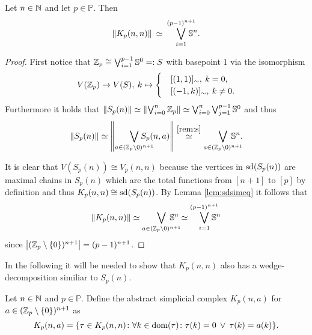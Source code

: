 \begin{lemma}
  Let $n \in \mathbb{N}$ and let $p \in \mathbb{P}$. Then
  \begin{equation*}
    \lVert K_p(n,n) \rVert \: \simeq \: \bigvee_{i=1}^{(p-1)^{n+1}}\hspace*{-10px}\mathbb{S}^{n}.
  \end{equation*}
\end{lemma}

\begin{proof}
  First notice that $\mathbb{Z}_p \cong \bigvee_{i=1}^{p-1}\mathbb{S}^0 =: S$ with basepoint $1$ via the isomorphism
  \begin{equation*}
    V(\mathbb{Z}_p) \to V(S), \: k \mapsto \begin{cases}
      &[(1, 1)]_\sim, \: k = 0, \\
      &[(-1,k)]_\sim, \: k \neq 0.
    \end{cases}
  \end{equation*}
  Furthermore it holds that $\lVert S_p(n) \rVert \simeq \left\lVert \bigvee_{i=0}^n\mathbb{Z}_p \right\rVert \simeq \bigvee_{i=0}^n\bigvee_{j=1}^{p-1}\mathbb{S}^0$ and thus
  \begin{equation*}
    \lVert S_p(n) \rVert \simeq \left\lVert \bigvee_{a\in(\Z_p \setminus {0})^{n+1}} \hspace*{-17px}S_p(n,a) \right\rVert \overset{\ref{rem:s}}{\simeq} \bigvee_{a\in(\Z_p \setminus {0})^{n+1}}\hspace*{-15px}\mathbb{S}^n.
  \end{equation*}

  It is clear that $V(S_p(n)) \cong V_p(n,n)$ because the vertices in ${\rm sd}(S_p(n))$ are maximal chains in $S_p(n)$ which are the total functions from $[n+1]$ to $[p]$ by definition and thus $K_p(n,n) \cong {\rm sd}(S_p(n))$. By Lemma \ref{lem:sdsimeq} it follows that
  \begin{equation*}
    \lVert K_p(n, n) \rVert \simeq \bigvee_{a\in(\Z_p \setminus {0})^{n+1}}\hspace*{-15px}\mathbb{S}^n \simeq \bigvee_{i=1}^{(p-1)^{n+1}}\hspace*{-10px}\mathbb{S}^n
  \end{equation*}
  since $\left|(\mathbb{Z}_p\setminus\{0\})^{n+1}\right| = (p-1)^{n+1}$.
\end{proof}

In the following it will be needed to show that $K_p(n,n)$ also has a wedge-decomposition similiar to $S_p(n)$.
\begin{defin}
  Let $n\in\mathbb{N}$ and $p\in \mathbb{P}$. Define the abstract simplicial complex $K_p(n,a)$ for $a \in (\mathbb{Z}_p\setminus\{0\})^{n+1}$ as
  \begin{equation*}
    K_p(n,a) = \{\tau \in K_p(n,n)\colon \forall k\in{\rm dom}(\tau)\colon \tau(k) = 0 \: \lor \: \tau(k) = a(k)\}. \qedhere
  \end{equation*}
\end{defin}

